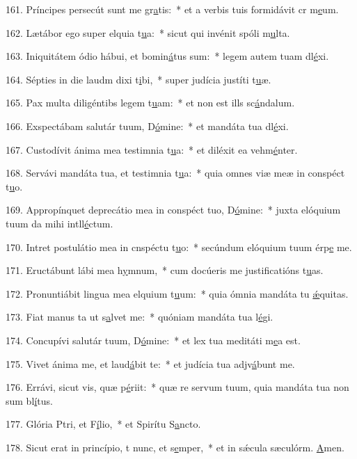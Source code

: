 161. Príncipes persecút sunt me gr\uline{a}tis:~* et a verbis tuis formidávit cr m\uline{e}um.\par 
162. Lætábor ego super elquia t\uline{u}a:~* sicut qui invénit spóli m\uline{u}lta.\par 
163. Iniquitátem ódio hábui, et bomin\uline{á}tus sum:~* legem autem tuam dl\uline{é}xi.\par 
164. Sépties in die laudm dixi t\uline{i}bi,~* super judícia justíti t\uline{u}æ.\par 
165. Pax multa diligéntibs legem t\uline{u}am:~* et non est ills sc\uline{á}ndalum.\par 
166. Exspectábam salutár tuum, D\uline{ó}mine:~* et mandáta tua dl\uline{é}xi.\par 
167. Custodívit ánima mea testimnia t\uline{u}a:~* et diléxit ea vehm\uline{é}nter.\par 
168. Servávi mandáta tua, et testimnia t\uline{u}a:~* quia omnes viæ meæ in conspéct t\uline{u}o.\par 
169. Appropínquet deprecátio mea in conspéct tuo, D\uline{ó}mine:~* juxta elóquium tuum da mihi intll\uline{é}ctum.\par 
170. Intret postulátio mea in cnspéctu t\uline{u}o:~* secúndum elóquium tuum érp\uline{e} me.\par 
171. Eructábunt lábi mea h\uline{y}mnum,~* cum docúeris me justificatións t\uline{u}as.\par 
172. Pronuntiábit lingua mea elquium t\uline{u}um:~* quia ómnia mandáta tu \uline{ǽ}quitas.\par 
173. Fiat manus ta ut s\uline{a}lvet me:~* quóniam mandáta tua l\uline{é}gi.\par 
174. Concupívi salutár tuum, D\uline{ó}mine:~* et lex tua meditáti m\uline{e}a est.\par 
175. Vivet ánima me, et laud\uline{á}bit te:~* et judícia tua adjv\uline{á}bunt me.\par 
176. Errávi, sicut vis, quæ p\uline{é}riit:~* quæ re servum tuum, quia mandáta tua non sum bl\uline{í}tus.\par 
177. Glória Ptri, et F\uline{í}lio,~* et Spirítu S\uline{a}ncto.\par 
178. Sicut erat in princípio, t nunc, et s\uline{e}mper,~* et in sǽcula sæculórm. \uline{A}men.\par 
